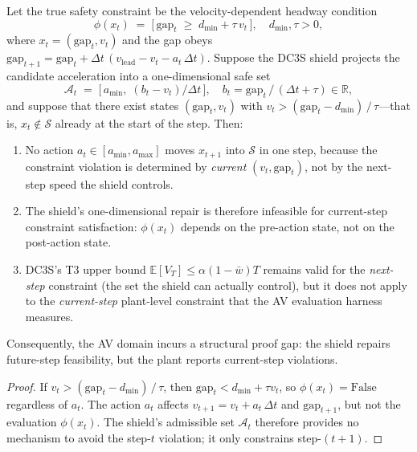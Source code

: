 \begin{proposition}
\label{prop:constraint-class-mismatch}
Let the true safety constraint be the velocity-dependent headway condition
\[
  \phi(x_t)
  \;=\;
  \bigl[\,\mathrm{gap}_t \;\ge\; d_{\min} + \tau\,v_t\,\bigr],
  \quad d_{\min},\tau > 0,
\]
where $x_t = (\mathrm{gap}_t, v_t)$ and the gap obeys
$\mathrm{gap}_{t+1} = \mathrm{gap}_t + \Delta t\,(v_{\mathrm{lead}}
- v_t - a_t\,\Delta t)$.  Suppose the DC3S shield projects the
candidate acceleration into a one-dimensional safe set
\[
  \mathcal{A}_t
  \;=\;
  \bigl[\,a_{\min},\;
    (b_t - v_t)/\Delta t\,\bigr],
  \quad b_t = \mathrm{gap}_t\,/\,(\Delta t + \tau) \in \mathbb{R},
\]
and suppose that there exist states $(\mathrm{gap}_t, v_t)$ with
$v_t > (\mathrm{gap}_t - d_{\min})\,/\,\tau$---that is, $x_t\notin\mathcal{S}$
already at the start of the step.
Then:
\begin{enumerate}
  \item No action $a_t \in [a_{\min}, a_{\max}]$ moves $x_{t+1}$ into
    $\mathcal{S}$ in one step, because the constraint violation is
    determined by \emph{current} $(v_t, \mathrm{gap}_t)$, not by the
    next-step speed the shield controls.
  \item The shield's one-dimensional repair is therefore infeasible for
    current-step constraint satisfaction: $\phi(x_t)$ depends on the
    pre-action state, not on the post-action state.
  \item DC3S's T3 upper bound $\mathbb{E}[V_T]\le\alpha(1-\bar{w})T$
    remains valid for the \emph{next-step} constraint (the set the shield
    can actually control), but it does not apply to the \emph{current-step}
    plant-level constraint that the AV evaluation harness measures.
\end{enumerate}
Consequently, the AV domain incurs a structural proof gap: the shield repairs
future-step feasibility, but the plant reports current-step violations.
\end{proposition}

\begin{proof}
If $v_t > (\mathrm{gap}_t - d_{\min})\,/\,\tau$, then
$\mathrm{gap}_t < d_{\min} + \tau v_t$, so $\phi(x_t) = \mathrm{False}$
regardless of $a_t$.  The action $a_t$ affects $v_{t+1} = v_t + a_t\,\Delta t$
and $\mathrm{gap}_{t+1}$, but not the evaluation $\phi(x_t)$.
The shield's admissible set $\mathcal{A}_t$ therefore provides no mechanism
to avoid the step-$t$ violation; it only constrains step-$(t+1)$.
\end{proof}

